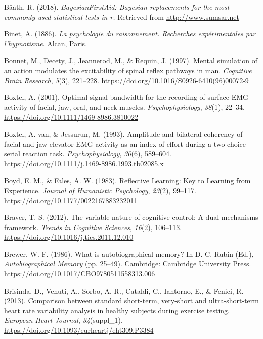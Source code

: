 \documentclass[a4paper,12pt,twoside,openright,oldfontcommands]{memoir}
\begin{document}
\leavevmode\hypertarget{ref-R-BayesianFirstAid}{}%
Bååth, R. (2018). \emph{BayesianFirstAid: Bayesian replacements for the most commonly used statistical tests in r.} Retrieved from \url{http://www.sumsar.net}

\leavevmode\hypertarget{ref-binet_psychologie_1886}{}%
Binet, A. (1886). \emph{La psychologie du raisonnement. Recherches expérimentales par l'hypnotisme}. Alcan, Paris.

\leavevmode\hypertarget{ref-bonnet_mental_1997}{}%
Bonnet, M., Decety, J., Jeannerod, M., \& Requin, J. (1997). Mental simulation of an action modulates the excitability of spinal reflex pathways in man. \emph{Cognitive Brain Research}, \emph{5}(3), 221--228. \url{https://doi.org/10.1016/S0926-6410(96)00072-9}

\leavevmode\hypertarget{ref-boxtel_optimal_2001}{}%
Boxtel, A. (2001). Optimal signal bandwidth for the recording of surface EMG activity of facial, jaw, oral, and neck muscles. \emph{Psychophysiology}, \emph{38}(1), 22--34. \url{https://doi.org/10.1111/1469-8986.3810022}

\leavevmode\hypertarget{ref-van_boxtel_amplitude_1993}{}%
Boxtel, A. van, \& Jessurun, M. (1993). Amplitude and bilateral coherency of facial and jaw-elevator EMG activity as an index of effort during a two-choice serial reaction task. \emph{Psychophysiology}, \emph{30}(6), 589--604. \url{https://doi.org/10.1111/j.1469-8986.1993.tb02085.x}

\leavevmode\hypertarget{ref-boyd_reflective_1983}{}%
Boyd, E. M., \& Fales, A. W. (1983). Reflective Learning: Key to Learning from Experience. \emph{Journal of Humanistic Psychology}, \emph{23}(2), 99--117. \url{https://doi.org/10.1177/0022167883232011}

\leavevmode\hypertarget{ref-braver_variable_2012}{}%
Braver, T. S. (2012). The variable nature of cognitive control: A dual mechanisms framework. \emph{Trends in Cognitive Sciences}, \emph{16}(2), 106--113. \url{https://doi.org/10.1016/j.tics.2011.12.010}

\leavevmode\hypertarget{ref-rubin_what_1986}{}%
Brewer, W. F. (1986). What is autobiographical memory? In D. C. Rubin (Ed.), \emph{Autobiographical Memory} (pp. 25--49). Cambridge: Cambridge University Press. \url{https://doi.org/10.1017/CBO9780511558313.006}

\leavevmode\hypertarget{ref-brisinda_comparison_2013}{}%
Brisinda, D., Venuti, A., Sorbo, A. R., Cataldi, C., Iantorno, E., \& Fenici, R. (2013). Comparison between standard short-term, very-short and ultra-short-term heart rate variability analysis in healthy subjects during exercise testing. \emph{European Heart Journal}, \emph{34}(suppl\_1). \url{https://doi.org/10.1093/eurheartj/eht309.P3384}
\end{document}
